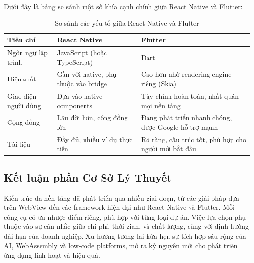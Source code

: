     Dưới đây là bảng so sánh một số khía cạnh chính giữa React Native và Flutter:

    \begin{table}[H]
        \centering
        \begin{tabular}{|l|p{3.5cm}|p{6cm}|}
            \hline
            \textbf{Tiêu chí} & \textbf{React Native} & \textbf{Flutter} \\
            \hline
            Ngôn ngữ lập trình & JavaScript (hoặc TypeScript) & Dart \\
            \hline
            Hiệu suất & Gần với native, phụ thuộc vào bridge & Cao hơn nhờ rendering engine riêng (Skia) \\
            \hline
            Giao diện người dùng & Dựa vào native components & Tùy chỉnh hoàn toàn, nhất quán mọi nền tảng \\
            \hline
            Cộng đồng & Lâu đời hơn, cộng đồng lớn & Đang phát triển nhanh chóng, được Google hỗ trợ mạnh \\
            \hline
            Tài liệu & Đầy đủ, nhiều ví dụ thực tiễn & Rõ ràng, cấu trúc tốt, phù hợp cho người mới bắt đầu \\
            \hline
        \end{tabular}
        \caption{So sánh các yếu tố giữa React Native và Flutter \cite{codetodeploy2025}}
    \end{table}

\subsection{Kết luận phần Cơ Sở Lý Thuyết}
\renewcommand{\labelitemi}{--}    
    
        Kiến trúc đa nền tảng đã phát triển qua nhiều giai đoạn, từ các giải pháp dựa trên WebView đến các framework hiện đại như React Native và Flutter. Mỗi công cụ có ưu nhược điểm riêng, phù hợp với từng loại dự án. Việc lựa chọn phụ thuộc vào sự cân nhắc giữa chi phí, thời gian, và chất lượng, cùng với định hướng dài hạn của doanh nghiệp. Xu hướng tương lai hứa hẹn sự tích hợp sâu rộng của AI, WebAssembly và low-code platforms, mở ra kỷ nguyên mới cho phát triển ứng dụng linh hoạt và hiệu quả.